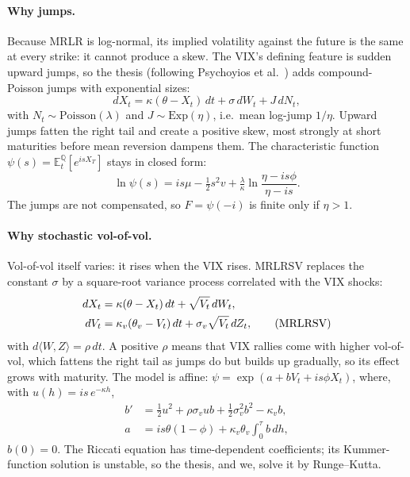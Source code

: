 \documentclass[10pt,twocolumn]{article}
\newcommand{\E}{\mathbb{E}}
\newcommand{\Q}{\mathbb{Q}}
\begin{document}
\paragraph{Why jumps.}
Because MRLR is log-normal, its implied volatility against the future is the same at
every strike: it cannot produce a skew. The VIX's defining feature is sudden upward
jumps, so the thesis (following Psychoyios et al.~\citep{psychoyios2010}) adds
compound-Poisson jumps with exponential sizes:
\begin{equation}
dX_t=\kappa(\theta-X_t)\,dt+\sigma\,dW_t+J\,dN_t,\tag{MRLRJ}
\end{equation}
with $N_t\sim\text{Poisson}(\lambda)$ and $J\sim\text{Exp}(\eta)$, i.e.\ mean
log-jump $1/\eta$. Upward jumps fatten the right tail and create a positive skew,
most strongly at short maturities before mean reversion dampens them. The
characteristic function $\psi(s)=\E^\Q_t[e^{isX_T}]$ stays in closed form:
\begin{equation}
\ln\psi(s)=is\mu-\tfrac12s^2v+\tfrac{\lambda}{\kappa}\ln\frac{\eta-is\phi}{\eta-is}.
\label{eq:cfj}
\end{equation}
The jumps are not compensated, so $F=\psi(-i)$ is finite only if $\eta>1$.

\paragraph{Why stochastic vol-of-vol.}
Vol-of-vol itself varies: it rises when the VIX rises. MRLRSV replaces the constant
$\sigma$ by a square-root variance process correlated with the VIX shocks:
\begin{align}
dX_t&=\kappa(\theta-X_t)\,dt+\sqrt{V_t}\,dW_t,\notag\\
dV_t&=\kappa_v(\theta_v-V_t)\,dt+\sigma_v\sqrt{V_t}\,dZ_t,\tag{MRLRSV}
\end{align}
with $d\langle W,Z\rangle=\rho\,dt$. A positive $\rho$ means that VIX rallies come with
higher vol-of-vol, which fattens the right tail as jumps do but builds up
gradually, so its effect grows with maturity. The model is affine:
$\psi=\exp(a+bV_t+is\phi X_t)$, where, with $u(h)=is\,e^{-\kappa h}$,
\begin{equation}
\begin{aligned}
b'&=\tfrac12u^2+\rho\sigma_vub+\tfrac12\sigma_v^2b^2-\kappa_vb,\\
a&=is\theta(1-\phi)+\kappa_v\theta_v\textstyle\int_0^\tau b\,dh,
\end{aligned}
\label{eq:riccati}
\end{equation}
$b(0)=0$. The Riccati equation has time-dependent coefficients; its Kummer-function
solution is unstable, so the thesis, and we, solve it by Runge--Kutta.
\end{document}
